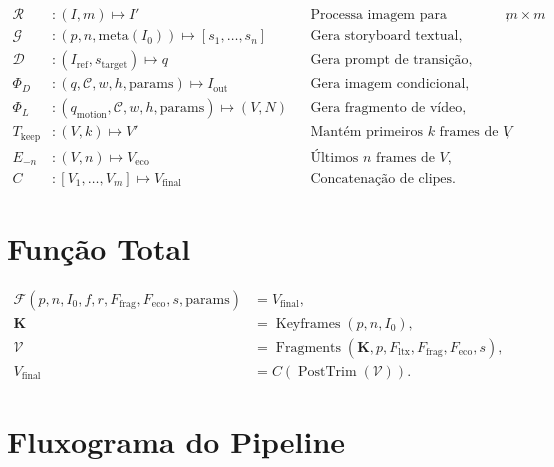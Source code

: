 \documentclass[12pt,a4paper]{article}
\begin{document}
\begin{align}
\mathcal{R} &: (I, m) \mapsto I' &&\text{Processa imagem para resolução $m \times m$},\\
\mathcal{G} &: (p, n, \mathrm{meta}(I_0)) \mapsto [s_1,\dots,s_n] &&\text{Gera storyboard textual},\\
\mathcal{D} &: (I_{\mathrm{ref}}, s_{\mathrm{target}}) \mapsto q &&\text{Gera prompt de transição},\\
\Phi_D &: (q, \mathcal{C}, w, h, \mathrm{params}) \mapsto I_{\mathrm{out}} &&\text{Gera imagem condicional},\\
\Phi_L &: (q_{\mathrm{motion}}, \mathcal{C}, w, h, \mathrm{params}) \mapsto (V, N) &&\text{Gera fragmento de vídeo},\\
T_{\mathrm{keep}} &: (V, k) \mapsto V' &&\text{Mantém primeiros $k$ frames de $V$},\\
E_{-n} &: (V, n) \mapsto V_{\mathrm{eco}} &&\text{Últimos $n$ frames de $V$},\\
C &: [V_1,\dots,V_m] \mapsto V_{\mathrm{final}} &&\text{Concatenação de clipes}.
\end{align}

\section{Função Total}

\begin{align}
\mathcal{F}(p,n,I_0,f,r,F_{\mathrm{frag}},F_{\mathrm{eco}},s,\mathrm{params}) &= V_{\mathrm{final}},\\
\mathbf{K} &= \operatorname{Keyframes}(p,n,I_0),\\
\mathcal{V} &= \operatorname{Fragments}(\mathbf{K}, p, F_{\mathrm{ltx}}, F_{\mathrm{frag}}, F_{\mathrm{eco}}, s),\\
V_{\mathrm{final}} &= C(\operatorname{PostTrim}(\mathcal{V})).
\end{align}

\section{Fluxograma do Pipeline}
\end{document}
